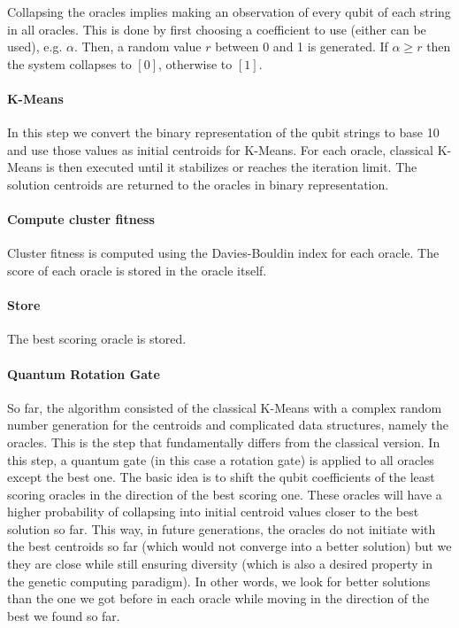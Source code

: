 Collapsing the oracles implies making an observation of every qubit of each string in all oracles.
This is done by first choosing a coefficient to use (either can be used), e.g. $\alpha$.
Then, a random value $r$ between 0 and 1 is generated.
If $\alpha \ge r$ then the system collapses to $[0]$, otherwise to $[1]$.

\paragraph{K-Means}
In this step we convert the binary representation of the qubit strings to base 10 and use those values as initial centroids for K-Means.
For each oracle, classical K-Means is then executed until it stabilizes or reaches the iteration limit.
The solution centroids are returned to the oracles in binary representation.

\paragraph{Compute cluster fitness}
Cluster fitness is computed using the Davies-Bouldin index for each oracle.
The score of each oracle is stored in the oracle itself.

\paragraph{Store}
The best scoring oracle is stored.

\paragraph{Quantum Rotation Gate}
So far, the algorithm consisted of the classical K-Means with a complex random number generation for the centroids and complicated data structures, namely the oracles.
This is the step that fundamentally differs from the classical version.
In this step, a quantum gate (in this case a rotation gate) is applied to all oracles except the best one.
The basic idea is to shift the qubit coefficients of the least scoring oracles in the direction of the best scoring one.
These oracles will have a higher probability of collapsing into initial centroid values closer to the best solution so far.
This way, in future generations, the oracles do not initiate with the best centroids so far (which would not converge into a better solution) but we they are close while still ensuring diversity (which is also a desired property in the genetic computing paradigm).
In other words, we look for better solutions than the one we got before in each oracle while moving in the direction of the best we found so far.


